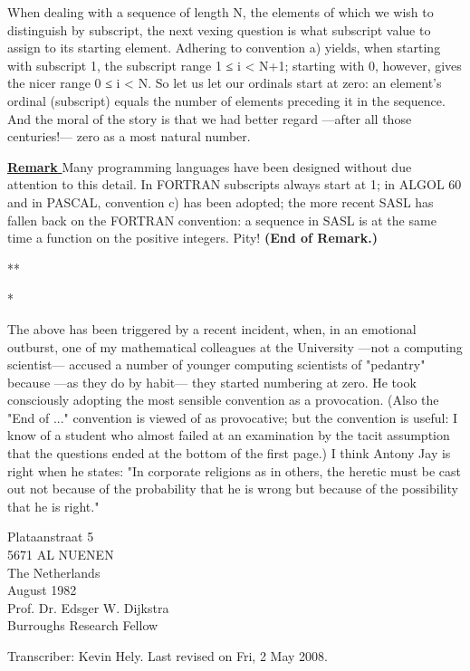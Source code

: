 \documentclass[]{article}
\begin{document}
When dealing with a sequence of length N, the elements of which we wish to distinguish by subscript, the next vexing question is what subscript value to assign to its starting element. Adhering to convention a) yields, when starting with subscript 1, the subscript range 1 ≤ i < N+1; starting with 0, however, gives the nicer range 0 ≤  i < N. So let us let our ordinals start at zero: an element's ordinal (subscript) equals the number of elements preceding it in the sequence. And the moral of the story is that we had better regard —after all those centuries!— zero as a most natural number.

\underline{\textbf{Remark} } Many programming languages have been designed without due attention to this detail. In FORTRAN subscripts always start at 1; in ALGOL 60 and in PASCAL, convention c) has been adopted; the more recent SASL has fallen back on the FORTRAN convention: a sequence in SASL is at the same time a function on the positive integers. Pity! \textbf{(End of Remark.)}\\
\begin{center} {\centering
		*\hspace*{3.5cm}*\par
		*
	}
\end{center}

The above has been triggered by a recent incident, when, in an emotional outburst, one of my mathematical colleagues at the University —not a computing scientist— accused a number of younger computing scientists of "pedantry" because —as they do by habit— they started numbering at zero. He took consciously adopting the most sensible convention as a provocation. (Also the "End of ..." convention is viewed of as provocative; but the convention is useful: I know of a student who almost failed at an examination by the tacit assumption that the questions ended at the bottom of the first page.) I think Antony Jay is right when he states: "In corporate religions as in others, the heretic must be cast out not because of the probability that he is wrong but because of the possibility that he is right."

\begin{multicols}{2}
	\noindent
Plataanstraat 5\\
5671 AL NUENEN\\
The Netherlands \\		

 August 1982\\
Prof. Dr. Edsger W. Dijkstra\\
Burroughs Research Fellow

\end{multicols}

\begin{flushleft}
	Transcriber: Kevin Hely.
Last revised on Fri, 2 May 2008.
\end{flushleft}
\end{document}
